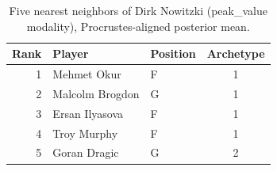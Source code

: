 \begin{table}[htbp]
  \centering\small
  \begin{tabular}{rllc}
    \toprule
    Rank & Player & Position & Archetype \\
    \midrule
    1 & Mehmet Okur & F & 1 \\
    2 & Malcolm Brogdon & G & 1 \\
    3 & Ersan Ilyasova & F & 1 \\
    4 & Troy Murphy & F & 1 \\
    5 & Goran Dragic & G & 2 \\
    \bottomrule
  \end{tabular}
  \caption{Five nearest neighbors of Dirk Nowitzki (peak_value modality), Procrustes-aligned posterior mean.}
  \label{tab:Dirk_Nowitzki_neighbors_peak_value}
\end{table}

